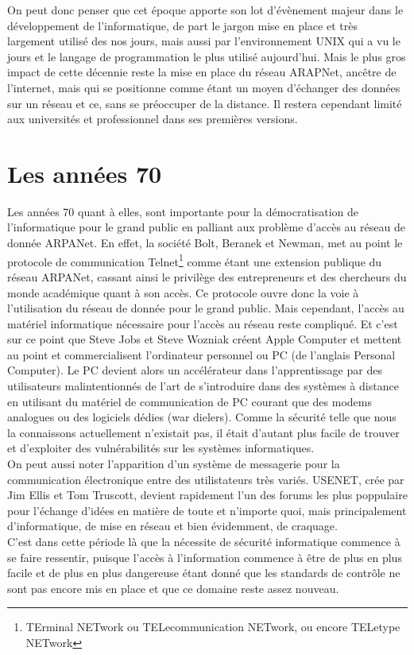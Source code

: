 \documentclass[a4paper]{memoir}
\begin{document}
On peut donc penser que cet époque apporte son lot d'évènement majeur dans le développement de l'informatique, de part le jargon mise en place et très largement utilisé des nos jours, mais aussi par l'environnement UNIX qui a vu le jours et le langage de programmation le plus utilisé aujourd'hui. Mais le plus gros impact de cette décennie reste la mise en place du réseau ARAPNet, ancêtre de l'internet, mais qui se positionne comme étant un moyen d'échanger des données sur un réseau et ce, sans se préoccuper de la distance. Il restera cependant limité aux universités et professionnel dans ses premières versions.

\section{Les années 70}

Les années 70 quant à elles, sont importante pour la démocratisation de l'informatique pour le grand public en palliant aux problème d'accès au réseau de donnée ARPANet. En effet, la société Bolt, Beranek et Newman, met au point le protocole de communication Telnet\footnote{TErminal NETwork ou TELecommunication NETwork, ou encore TELetype NETwork} comme étant une extension publique du réseau ARPANet, cassant ainsi le privilège des entrepreneurs et des chercheurs du monde académique quant à son accès. Ce protocole ouvre donc la voie à l'utilisation du réseau de donnée pour le grand public. Mais cependant, l'accès au matériel informatique nécessaire pour l'accès au réseau reste compliqué. Et c'est sur ce point que Steve Jobs et Steve Wozniak créent Apple Computer et mettent au point et commercialisent l'ordinateur personnel ou PC (de l'anglais Personal Computer). Le PC devient alors un accélérateur dans l'apprentissage par des utilisateurs malintentionnés de l'art de s'introduire dans des systèmes à distance en utilisant du matériel de communication de PC courant que des modems analogues ou des logiciels dédies (war dielers). Comme la sécurité telle que nous la connaissons actuellement n'existait pas, il était d'autant plus facile de trouver et d'exploiter des vulnérabilités sur les systèmes informatiques.\\
\noindent On peut aussi noter l'apparition d'un système de messagerie pour la communication électronique entre des utilistateurs très variés. USENET, crée par Jim Ellis et Tom Truscott, devient rapidement l'un des forums les plus poppulaire pour l'échange d'idées en matière de toute et n'importe quoi, mais principalement d'informatique, de mise en réseau et bien évidemment, de craquage.\\
C'est dans cette période là que la nécessite de sécurité informatique commence à se faire ressentir, puisque l'accès à l'information commence à être de plus en plus facile et de plus en plus dangereuse étant donné que les standards de contrôle ne sont pas encore mis en place et que ce domaine reste assez nouveau.
\end{document}
